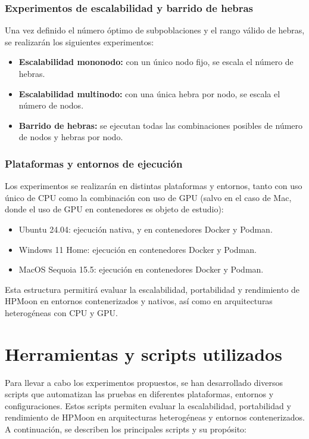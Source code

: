 \subsubsection{Experimentos de escalabilidad y barrido de hebras}

Una vez definido el número óptimo de subpoblaciones y el rango válido de hebras, se realizarán los siguientes experimentos:

\begin{itemize}
    \item \textbf{Escalabilidad mononodo:} con un único nodo fijo, se escala el número de hebras.
    \item \textbf{Escalabilidad multinodo:} con una única hebra por nodo, se escala el número de nodos.
    \item \textbf{Barrido de hebras:} se ejecutan todas las combinaciones posibles de número de nodos y hebras por nodo.
\end{itemize}

\subsubsection{Plataformas y entornos de ejecución}

Los experimentos se realizarán en distintas plataformas y entornos, tanto con uso único de CPU como la combinación con uso de GPU (salvo en el caso de Mac, donde el uso de GPU en contenedores es objeto de estudio):

\begin{itemize}
    \item Ubuntu 24.04: ejecución nativa, y en contenedores Docker y Podman.
    \item Windows 11 Home: ejecución en contenedores Docker y Podman.
    \item MacOS Sequoia 15.5: ejecución en contenedores Docker y Podman.
\end{itemize}

Esta estructura permitirá evaluar la escalabilidad, portabilidad y rendimiento de HPMoon en entornos contenerizados y nativos, así como en arquitecturas heterogéneas con CPU y GPU.

\section{Herramientas y scripts utilizados}\label{sec:herramientas_scripts}

Para llevar a cabo los experimentos propuestos, se han desarrollado diversos scripts que automatizan las pruebas en diferentes plataformas, entornos y configuraciones. Estos scripts permiten evaluar la escalabilidad, portabilidad y rendimiento de HPMoon en arquitecturas heterogéneas y entornos contenerizados. A continuación, se describen los principales scripts y su propósito:

